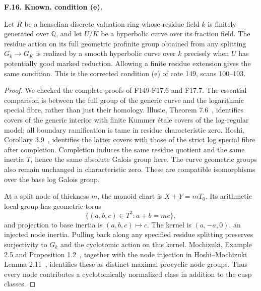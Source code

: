 \documentclass[11pt,oneside]{article}
\makeatletter
\newcounter{statementanchor}
\newenvironment{statement}[3]{%
 \refstepcounter{statementanchor}\def\@currentlabel{#1}%
 \par\addvspace{9pt}\noindent
 \textbf{#1. #2. #3.}\par\nobreak\noindent\ignorespaces
}{\par\addvspace{5pt}}
\makeatother
\begin{document}
\begin{statement}{F.16}{Known}{condition (e)}
\label{st:F.16}
\label{F-reduction}
Let $R$ be a henselian discrete valuation ring whose residue field
$k$ is finitely generated over $\mathbb Q$, and let $U/K$ be a
hyperbolic curve over its fraction field. The residue action on
its full geometric profinite group obtained from any splitting
$G_k\to G_K$ is realized by a smooth hyperbolic curve over $k$
precisely when $U$ has potentially good marked reduction. Allowing
a finite residue extension gives the same condition. This is the
corrected condition (e) of cote 149, scans 100--103.
\end{statement}
\begin{proof}
We checked the complete proofs of F149-F17.6 and F17.7. The
essential comparison is between the full group of the generic
curve and the logarithmic special fibre, rather than just their
homology. Illusie, Theorem 7.6~\cite{F-Illusie}, identifies covers
of the generic interior with finite Kummer \'etale covers of the
log-regular model; all boundary ramification is tame in residue
characteristic zero. Hoshi, Corollary 3.9~\cite{F-HoshiLog},
identifies the latter covers with those of the strict log special
fibre after completion. Completion induces the same residue
quotient and the same inertia $T$, hence the same absolute Galois
group here. The curve geometric groups also remain unchanged in
characteristic zero. These are compatible isomorphisms over the
base log Galois group.

At a split node of thickness $m$, the monoid chart is
$X+Y=mT_0$. Its arithmetic local group has geometric torus
\[
 \{(a,b,c)\in T^3:a+b=mc\},
\]
and projection to base inertia is $(a,b,c)\mapsto c$. The kernel
is $(a,-a,0)$, an injected node inertia. Pulling back along any
specified residue splitting preserves surjectivity to $G_k$ and
the cyclotomic action on this kernel. Mochizuki, Example 2.5 and
Proposition 1.2~\cite{F-MochizukiCombinatorial}, together with the
node injection in Hoshi--Mochizuki Lemma 2.11~\cite{F-HoshiMochizukiNodes},
identifies these as distinct maximal procyclic node groups.
Thus every node contributes a cyclotomically normalized class
in addition to the cusp classes.


\end{proof}
\end{document}
